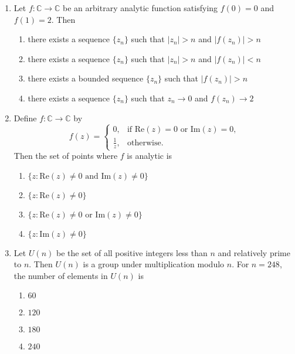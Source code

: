 \documentclass[journal]{IEEEtran}
\numberwithin{equation}{enumi}
\numberwithin{figure}{enumi}
\begin{document}
\begin{enumerate}
\item Let $f: \mathbb{C} \rightarrow \mathbb{C}$ be an arbitrary analytic function satisfying $f(0) = 0$ and $f(1) = 2$. Then  \hfill{}

\begin{enumerate}
\item  there exists a sequence $\{z_n\}$ such that $|z_n| > n$ and $|f(z_n)| > n$\\
\item there exists a sequence $\{z_n\}$ such that $|z_n| > n$ and $|f(z_n)| < n$\\
\item there exists a bounded sequence $\{z_n\}$ such that $|f(z_n)| > n$\\
\item there exists a sequence $\{z_n\}$ such that $z_n \rightarrow 0$ and $f(z_n) \rightarrow 2$
\end{enumerate}


\item Define $f : \mathbb{C} \rightarrow \mathbb{C}$ by
\[
f(z) =
\begin{cases}
0, & \text{if } \text{Re}(z) = 0 \text{ or } \text{Im}(z) = 0,\\
\frac{1}{z}, & \text{otherwise}.
\end{cases}
\]
Then the set of points where $f$ is analytic is    
\hfill{}

\begin{multicols}{2}
    \begin{enumerate}
        \item $\{z : \text{Re}(z) \neq 0 \text{ and } \text{Im}(z) \neq 0 \}$
        \item $\{z : \text{Re}(z) \neq 0 \}$
        \item $\{z : \text{Re}(z) \neq 0 \text{ or } \text{Im}(z) \neq 0 \}$
        \item $\{z : \text{Im}(z) \neq 0 \}$ 
    \end{enumerate}
    \end{multicols}


\item Let $U(n)$ be the set of all positive integers less than $n$ and relatively prime to $n$. Then $U(n)$ is a group under multiplication modulo $n$. For $n = 248$, the number of elements in $U(n)$ is
\hfill{}
\begin{multicols}{4}
\begin{enumerate}
    \item $60$
    \item $120$
    \item $180$
    \item $240$
\end{enumerate}
\end{multicols}




\end{enumerate}
\end{document}
